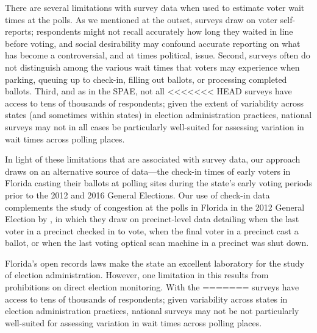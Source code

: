 \documentclass[12pt,titlepage]{article}
\begin{document}
There are several limitations with survey data when used to estimate
voter wait times at the polls. As we mentioned at the outset, surveys
draw on voter self-reports; respondents might not recall accurately
how long they waited in line before voting, and social desirability
may confound accurate reporting on what has become a controversial,
and at times political, issue.  Second, surveys often do not
distinguish among the various wait times that voters may experience
when parking, queuing up to check-in, filling out ballots, or
processing completed ballots. Third, and as in the SPAE, not all
<<<<<<< HEAD
surveys have access to tens of thousands of respondents; given the
extent of variability across states (and sometimes within states) in
election administration practices, national surveys may not in all
cases be particularly well-suited for assessing variation in wait
times across polling places.

In light of these limitations that are associated with survey data,
our approach draws on an alternative source of data---the check-in
times of early voters in Florida casting their ballots at polling
sites during the state's early voting periods prior to the 2012 and
2016 General Elections.  Our use of check-in data complements the
study of congestion at the polls in Florida in the 2012 General
Election by \cite{herronsmith:closingtimes}, in which they draw on
precinct-level data detailing when the last voter in a precinct
checked in to vote, when the final voter in a precinct cast a ballot,
or when the last voting optical scan machine in a precinct was shut
down.

Florida's open records laws make the state an excellent laboratory for
the study of election administration.  However, one limitation in this
results from prohibitions on direct election monitoring.  With the
=======
surveys have access to tens of thousands of respondents; given
variability across states in election administration practices,
national surveys may not be not particularly well-suited for assessing
variation in wait times across polling places.

\end{document}

